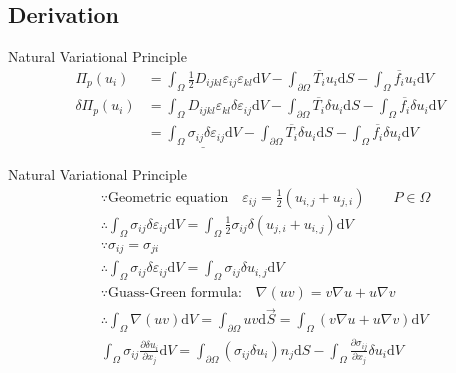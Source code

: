 \documentclass[11pt]{beamer}
\begin{document}
\subsection{Derivation}
\begin{frame}{Natural Variational Principle}
\begin{align}
\Pi_p(u_i)&=\int_\Omega\frac{1}{2}D_{ijkl}\varepsilon_{ij}\varepsilon_{kl}\mathrm{d}V-\int_{\partial\Omega}\overline{T_i}u_i\mathrm{d}S-\int_\Omega\overline{f_i}u_i\mathrm{d}V
\\
\delta\Pi_p(u_i)&=\int_\Omega D_{ijkl}\varepsilon_{kl}\delta\varepsilon_{ij}\mathrm{d}V-\int_{\partial\Omega}\overline{T_i}\delta u_i\mathrm{d}S-\int_\Omega\overline{f_i}\delta u_i\mathrm{d}V
\\
&=\underline{\int_\Omega\sigma_{ij}\delta\varepsilon_{ij}\mathrm{d}V}-\int_{\partial\Omega}\overline{T_i}\delta u_i\mathrm{d}S-\int_\Omega\overline{f_i}\delta u_i\mathrm{d}V
\end{align}
\end{frame}

\begin{frame}{Natural Variational Principle}
\begin{align}    
&\because\nonumber{\text{Geometric equation}}\quad \varepsilon_{ij}=\frac{1}{2}(u_{i,j}+u_{j,i})\qquad P\in\Omega
\\
&\therefore\int_{\Omega}\sigma_{ij}\delta \varepsilon_{ij}\mathrm{d}V
=\int_{\Omega}\frac{1}{2}\sigma_{ij}\delta (u_{j,i}+u_{i,j})\mathrm{d}V
\\
&\because \sigma_{ij} = \sigma_{ji}
\\
&\therefore \int_{\Omega}\sigma_{ij}\delta \varepsilon_{ij}\mathrm{d}V
=\int_{\Omega}\sigma_{ij}\delta u_{i,j}\mathrm{d}V
\\
&\because \nonumber{\text{Guass-Green formula:}}\quad \nabla(uv) = v \nabla u + u \nabla v
\\
&\therefore \int_{\Omega}\nabla(uv)\mathrm{d}V = \int_{\partial\Omega}uv\mathrm{d}\overrightarrow{S} = \int_{\Omega}\left(v \nabla u + u \nabla v\right)\mathrm{d}V
\\
&\int_{\Omega}\sigma_{ij}\frac{\partial\delta u_i}{\partial x_j} \mathrm{d}V = \int_{\partial\Omega}(\sigma_{ij}\delta u_i) n_j \mathrm{d}S -\int_{\Omega}\frac{\partial\sigma_{ij}}{\partial x_j}\delta u_i \mathrm{d}V
\end{align}
\end{frame}
\end{document}
